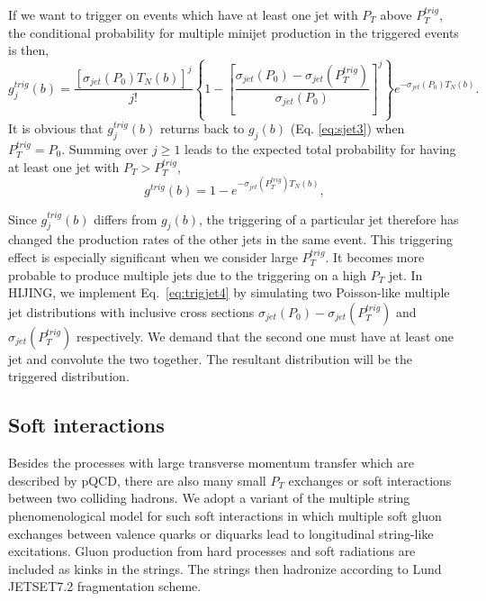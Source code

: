 If we want to trigger on events which have at least one 
jet with $P_T$ above $P_T^{trig}$, the conditional 
probability for multiple minijet production in the 
triggered events is then\cite{hijing},
\begin{equation}
        g_j^{trig}(b) = \frac{[\sigma_{jet}(P_0)T_N(b)]^j}{j!}
        \left\{1-\left[\frac{\sigma_{jet}(P_0)-\sigma_{jet}(P_T^{trig})}
        {\sigma_{jet}(P_0)}\right]^j\right\}e^{-\sigma_{jet}(P_0)T_N(b)}.
                 \label{eq:trigjet4}
\end{equation}
It is obvious that $g_j^{trig}(b)$ returns back to $g_j(b)$ 
(Eq. \ref{eq:sjet3}) when $P_T^{trig}=P_0$.  Summing over $j\geq 1$
leads to the expected total probability for having at least one 
jet with $P_T>P_T^{trig}$,
\begin{equation}
        g^{trig}(b)=1-e^{-\sigma_{jet}(P_T^{trig})T_N(b)}, 
                 \label{eq:trigjet5}
\end{equation}

        Since $g_j^{trig}(b)$ differs from $g_j(b)$, the 
triggering of a particular jet therefore has changed the 
production rates of the other jets in the same event. 
This triggering effect is especially significant when we 
consider large $P_T^{trig}$.  It becomes more probable to 
produce multiple jets due to the triggering on a high $P_T$ jet. 
In HIJING, we implement Eq.~\ref{eq:trigjet4} by simulating 
two Poisson-like multiple jet distributions with inclusive 
cross sections  $\sigma_{jet}(P_0)-\sigma_{jet}(P_T^{trig})$ 
and $\sigma_{jet}(P_T^{trig})$ respectively. We demand that 
the second one must have at least one jet and convolute the 
two together. The resultant distribution will be the 
triggered distribution. 

\subsection{Soft interactions}

        Besides the processes with large transverse momentum 
transfer which are described by pQCD, there are also many 
small $P_T$ exchanges or soft interactions between two colliding 
hadrons.  We adopt a variant of the multiple string phenomenological
model for such soft interactions in which multiple soft gluon
exchanges between valence quarks or diquarks lead to longitudinal
string-like excitations. Gluon production from hard processes
and soft radiations are included as kinks in the strings.
The strings then hadronize according to Lund JETSET7.2 fragmentation
scheme.

